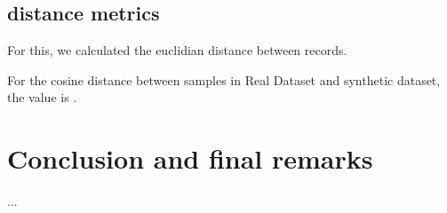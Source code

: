\documentclass{article}
\begin{document}
\subsection{distance metrics}

For this, we calculated the euclidian distance between records.

For the cosine distance between samples in Real Dataset and synthetic dataset, the value is .



\section{Conclusion and final remarks}

...

\cleardoublepage
\printglossary[type=\acronymtype]
\cleardoublepage


\end{document}
